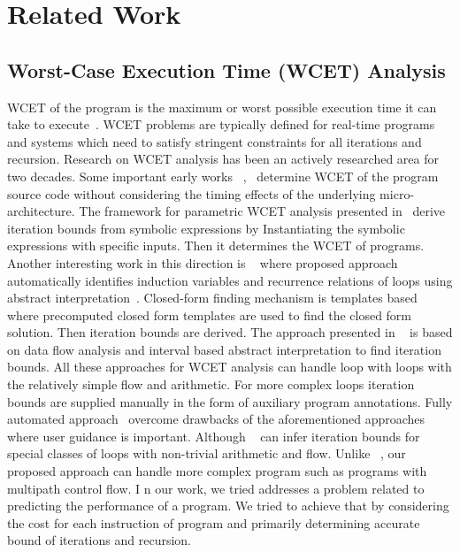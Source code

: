 \section{Related Work}
\label{sec:related}

\subsection{Worst-Case Execution Time (WCET) Analysis} 
WCET of the program is the maximum or worst possible execution time it can take to execute~\cite{Wilhelm:2008:WEP:1347375.1347389}. WCET problems are typically defined for real-time programs and systems which need to satisfy stringent constraints for all iterations and recursion.
Research on WCET analysis has been an actively researched area for two decades. 
Some important early works ~\cite{Puschner:1989:CME:84842.84850},~\cite{Zhang1993} determine WCET of the program source code without considering the timing effects of the underlying micro-architecture. 
The framework for parametric WCET analysis presented in~\cite{DBLP:conf/wcet/Lisper03} derive iteration bounds from symbolic expressions by Instantiating the symbolic expressions with specific inputs. 
Then it determines the WCET of programs. Another interesting work in this direction is ~\cite{4617284} where proposed approach automatically identifies induction variables and recurrence relations of loops using abstract interpretation~\cite{Ammarguellat:1990:ARI:93542.93583}. Closed-form finding mechanism is templates based where precomputed closed form templates are used to find the closed form solution. Then iteration bounds are derived. The approach presented in ~\cite{Prantltubound} is based on data flow analysis and interval based abstract interpretation to find iteration bounds. 
All these approaches for WCET analysis can handle loop with loops with the relatively simple flow and arithmetic.
For more complex loops iteration bounds are supplied manually in the form of auxiliary program annotations. Fully automated approach~\cite{Knoop:2011:SLB:2341512.2341532} overcome drawbacks of the aforementioned approaches where user guidance is important. Although ~\cite{Knoop:2011:SLB:2341512.2341532} can infer iteration bounds for special classes of loops with non-trivial arithmetic and flow. Unlike ~\cite{Knoop:2011:SLB:2341512.2341532}, our proposed approach can handle more complex program such as programs with multipath control flow. I
n our work, we tried addresses a problem related to predicting the performance of a program. We tried to achieve that by considering the cost for each instruction of program and primarily determining accurate bound of iterations and recursion.

